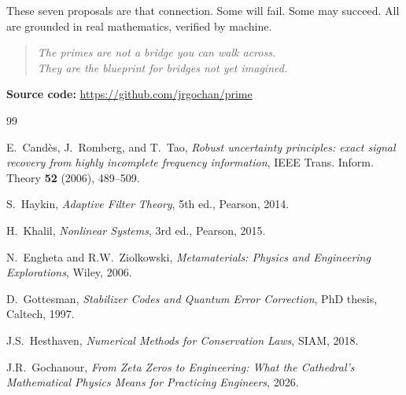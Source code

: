 \documentclass[11pt,a4paper]{article}
\begin{document}
These seven proposals are that connection. Some will fail. Some may
succeed. All are grounded in real mathematics, verified by machine.

\begin{quote}
\emph{The primes are not a bridge you can walk across.\\
They are the blueprint for bridges not yet imagined.}
\end{quote}

\vspace{0.5cm}
\noindent\textbf{Source code:} \url{https://github.com/jrgochan/prime}

\begin{thebibliography}{99}

E.~Cand\`es, J.~Romberg, and T.~Tao, \emph{Robust uncertainty
principles: exact signal recovery from highly incomplete frequency
information}, IEEE Trans. Inform. Theory \textbf{52} (2006), 489--509.

S.~Haykin, \emph{Adaptive Filter Theory}, 5th ed., Pearson, 2014.

H.~Khalil, \emph{Nonlinear Systems}, 3rd ed., Pearson, 2015.

N.~Engheta and R.W.~Ziolkowski, \emph{Metamaterials: Physics and
Engineering Explorations}, Wiley, 2006.

D.~Gottesman, \emph{Stabilizer Codes and Quantum Error Correction},
PhD thesis, Caltech, 1997.

J.S.~Hesthaven, \emph{Numerical Methods for Conservation Laws},
SIAM, 2018.

J.R.~Gochanour, \emph{From Zeta Zeros to Engineering: What the
Cathedral's Mathematical Physics Means for Practicing Engineers},
2026.

\end{thebibliography}
\end{document}
